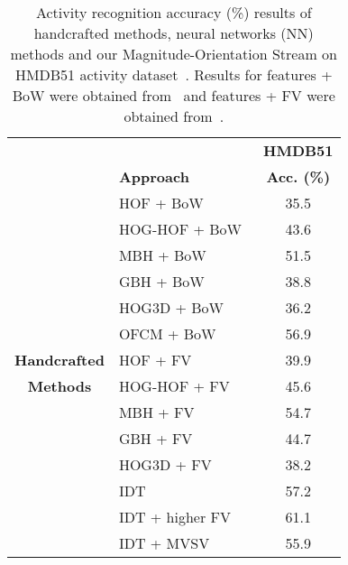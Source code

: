 \documentclass[10pt,conference]{IEEEtran}
\begin{document}
\begin{table}[!htb]
	\centering
	\begin{small}
		\caption{Activity recognition accuracy (\%) results of handcrafted methods, neural networks (NN) methods and our Magnitude-Orientation Stream on HMDB51 activity dataset~\cite{Kuehne:2011}. Results for features + BoW were obtained from~\cite{Shi:2015} and features + FV were obtained from~\cite{Shi:2014:Dissertation}.}
		\begin{tabular}{clc}
			\toprule
			& & \multicolumn{1}{c}{\textbf{HMDB51}} \\
			& \textbf{Approach} & \multicolumn{1}{c}{\textbf{Acc. (\%)}} \\
			\toprule
			& HOF + BoW~\cite{Laptev:2008} & \multicolumn{1}{c}{35.5} \\ 
			& HOG-HOF + BoW~\cite{Laptev:2008}  & \multicolumn{1}{c}{43.6} \\ 
			& MBH + BoW~\cite{Dalal:2006}  & \multicolumn{1}{c}{51.5} \\ 
			& GBH + BoW~\cite{Shi:2015}  & \multicolumn{1}{c}{38.8} \\ 
			& HOG3D + BoW~\cite{Klaser:2008}  & \multicolumn{1}{c}{36.2} \\ 
			& OFCM + BoW~\cite{Caetano:2016}  & \multicolumn{1}{c}{56.9} \\ 
			
			\multirow{1}{*}{\textbf{Handcrafted}} & HOF + FV~\cite{Laptev:2008}  & \multicolumn{1}{c}{39.9} \\ 
			\multirow{1}{*}{\textbf{Methods}} & HOG-HOF + FV~\cite{Laptev:2008}  & \multicolumn{1}{c}{45.6} \\ 
			& MBH + FV~\cite{Dalal:2006} & \multicolumn{1}{c}{54.7} \\  
			& GBH + FV~\cite{Shi:2015}  & \multicolumn{1}{c}{44.7} \\  
			& HOG3D + FV~\cite{Klaser:2008} & \multicolumn{1}{c}{38.2} \\ 
			
			& IDT~\cite{Wang:2013} & \multicolumn{1}{c}{57.2} \\ 
			& IDT + higher FV~\cite{Peng:2016}  & \multicolumn{1}{c}{61.1} \\
			& IDT + MVSV~\cite{Cai:2014} & \multicolumn{1}{c}{55.9} \\
			\midrule
			

\end{tabular}
\end{small}
\end{table}
\end{document}
